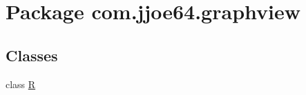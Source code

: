 \hypertarget{namespacecom_1_1jjoe64_1_1graphview}{}\section{Package com.\+jjoe64.\+graphview}
\label{namespacecom_1_1jjoe64_1_1graphview}
\subsection*{Classes}
\begin{DoxyCompactItemize}
\item 
class \mbox{\hyperlink{classcom_1_1jjoe64_1_1graphview_1_1_r}{R}}
\end{DoxyCompactItemize}

